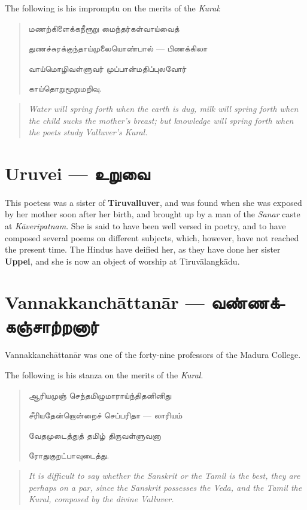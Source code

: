 \documentclass{article}
\newcommand{\TamilText}[1]{\texttamil{#1}}
\newcommand{\TamilBold}[1]{\texttamil{\textbf{#1}}}
\newcommand{\tam}[1]{\TamilText{#1}}
\newcommand{\tambold}[1]{\TamilBold{#1}}
\begin{document}
The following is his impromptu on the merits of the \emph{Kural}:
\begin{quotation}\small
\tam{மணற்கிளைக்கநீரூறு மைந்தர்கள்வாய்வைத்}

\tam{துணச்சுரக்குந்தாய்முலையொண்பால்‌} --- \tam{பிணக்கிலா}

\tam{வாய்மொழிவள்ளுவர்‌ முப்பான்மதிப்புலவோர்}

\tam{காய்தொறுமூறுமறிவு}.
\end{quotation}
\begin{quotation}\small
\emph{Water will spring forth when the earth is dug, milk will spring forth when the child sucks the mother's breast; but knowledge will spring forth when the poets study Valluver's Kural.}
\end{quotation}

\section{Uruvei --- \tambold{உறுவை}}
\paragraph{}
This poetess was a sister of \textbf{Tiruvalluver}, and was found when she was exposed by her mother soon after her birth, and brought up by a man of the \emph{Sanar} caste at \emph{K\={a}veripatnam}. She is said to have been well versed in poetry, and to have composed several poems on different subjects, which, however, have not reached the present time. The Hindus have deified her, as they have done her sister \textbf{Uppei}, and she is now an object of worship at Tiruv\={a}langk\={a}du.

\section{Vannakkanch\={a}ttan\={a}r --- \tambold{வண்ணக்கஞ்சாற்றனார்}}
\paragraph{}
Vannakkanch\={a}ttan\={a}r was one of the forty-nine professors of the Madura College.

The following is his stanza on the merits of the \emph{Kural}.
\begin{quotation}\small
\tam{ஆரியமுஞ்‌ செந்தமிழுமாராய்ந்திதனினிது}

\tam{சீரியதேன்றொன்றைச்‌ செப்பரிதா} --- \tam{லாரியம்‌}

\tam{வேதமுடைத்துத்‌ தமிழ்‌ திருவள்ளுவனா}

\tam{ரோதுகுறட்பாவுடைத்து}.
\end{quotation}
\begin{quotation}\small
\emph{It is difficult to say whether the Sanskrit or the Tamil is the best, they are perhaps on a par, since the Sanskrit possesses the Veda, and the Tamil the Kural, composed by the divine Valluver.}
\end{quotation}
\end{document}
